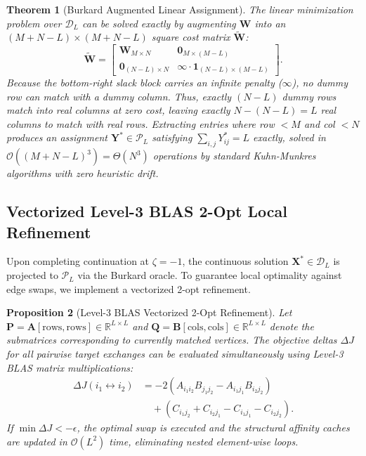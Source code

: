 \documentclass[a4paper,fleqn]{cas-dc}
\theoremstyle{thmstyleone}
\newtheorem{theorem}{Theorem}
\newtheorem{proposition}[theorem]{Proposition}
\theoremstyle{thmstyletwo}
\theoremstyle{thmstylethree}
\begin{document}
\begin{theorem}[Burkard Augmented Linear Assignment]
\label{thm:burkard}
The linear minimization problem over $\mathcal{D}_L$ can be solved exactly by augmenting $\mathbf{W}$ into an $(M+N-L) \times (M+N-L)$ square cost matrix $\widetilde{\mathbf{W}}$:
\begin{equation}
\widetilde{\mathbf{W}} = \begin{bmatrix}
\mathbf{W}_{M \times N} & \mathbf{0}_{M \times (M - L)} \\
\mathbf{0}_{(N - L) \times N} & \infty \cdot \mathbf{1}_{(N - L) \times (M - L)}
\end{bmatrix}.
\label{eq:augmented_W}
\end{equation}
Because the bottom-right slack block carries an infinite penalty ($\infty$), no dummy row can match with a dummy column. Thus, exactly $(N-L)$ dummy rows match into real columns at zero cost, leaving exactly $N - (N - L) = L$ real columns to match with real rows. Extracting entries where row $< M$ and col $< N$ produces an assignment $\mathbf{Y}^* \in \mathcal{P}_L$ satisfying $\sum_{i,j} Y^*_{ij} = L$ exactly, solved in $\mathcal{O}((M+N-L)^3) = \Theta(N^3)$ operations by standard Kuhn-Munkres algorithms with zero heuristic drift.
\end{theorem}

\subsection{Vectorized Level-3 BLAS 2-Opt Local Refinement}
Upon completing continuation at $\zeta = -1$, the continuous solution $\mathbf{X}^* \in \mathcal{D}_L$ is projected to $\mathcal{P}_L$ via the Burkard oracle. To guarantee local optimality against edge swaps, we implement a vectorized 2-opt refinement.

\begin{proposition}[Level-3 BLAS Vectorized 2-Opt Refinement]
\label{prop:2opt}
Let $\mathbf{P} = \mathbf{A}[\mathrm{rows}, \mathrm{rows}] \in \mathbb{R}^{L \times L}$ and $\mathbf{Q} = \mathbf{B}[\mathrm{cols}, \mathrm{cols}] \in \mathbb{R}^{L \times L}$ denote the submatrices corresponding to currently matched vertices. The objective deltas $\Delta J$ for all pairwise target exchanges can be evaluated simultaneously using Level-3 BLAS matrix multiplications:
\begin{align}
\Delta J(i_1 \leftrightarrow i_2) &= -2 \left( A_{i_1 i_2} B_{j_1 j_2} - A_{i_1 j_1} B_{i_2 j_2} \right) \nonumber \\
&\quad + (C_{i_1 j_2} + C_{i_2 j_1} - C_{i_1 j_1} - C_{i_2 j_2}).
\label{eq:2opt}
\end{align}
If $\min \Delta J < -\epsilon$, the optimal swap is executed and the structural affinity caches are updated in $\mathcal{O}(L^2)$ time, eliminating nested element-wise loops.
\end{proposition}
\end{document}
